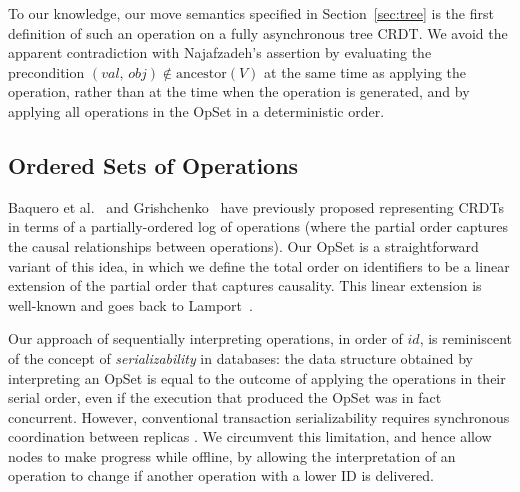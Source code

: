 To our knowledge, our move semantics specified in Section~\ref{sec:tree} is the first definition of such an operation on a fully asynchronous tree CRDT.
We avoid the apparent contradiction with Najafzadeh's assertion by evaluating the precondition $(\mathit{val},\, \mathit{obj}) \notin \mathrm{ancestor}(V)$ at the same time as applying the operation, rather than at the time when the operation is generated, and by applying all operations in the OpSet in a deterministic order.

\subsection{Ordered Sets of Operations}

Baquero et al.~\cite{Baquero:2014ed} and Grishchenko~\cite{Grishchenko:2014eh} have previously proposed representing CRDTs in terms of a partially-ordered log of operations (where the partial order captures the causal relationships between operations).
Our OpSet is a straightforward variant of this idea, in which we define the total order on identifiers to be a linear extension of the partial order that captures causality.
This linear extension is well-known and goes back to Lamport~\cite{Lamport:1978jq}.

Our approach of sequentially interpreting operations, in order of $\mathit{id}$, is reminiscent of the concept of \emph{serializability} in databases: the data structure obtained by interpreting an OpSet is equal to the outcome of applying the operations in their serial order, even if the execution that produced the OpSet was in fact concurrent.
However, conventional transaction serializability requires synchronous coordination between replicas \cite{Davidson:1985hv}.
We circumvent this limitation, and hence allow nodes to make progress while offline, by allowing the interpretation of an operation to change if another operation with a lower ID is delivered.
